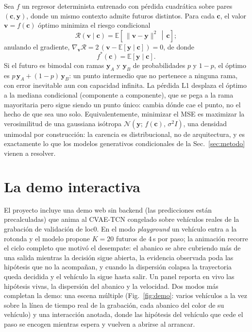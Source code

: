 \documentclass[conference,a4paper]{IEEEtran}
\begin{document}
Sea $f$ un regresor determinista entrenado con pérdida cuadrática sobre
pares $(\mathbf{c}, \mathbf{y})$, donde un mismo contexto admite futuros
distintos. Para cada $\mathbf{c}$, el valor $\mathbf{v} = f(\mathbf{c})$
óptimo minimiza el riesgo condicional
\begin{equation}
\mathcal{R}(\mathbf{v} \mid \mathbf{c}) =
\mathbb{E}\!\left[\,\|\mathbf{v}-\mathbf{y}\|^2 \,\middle|\, \mathbf{c}\right];
\end{equation}
anulando el gradiente, $\nabla_{\mathbf{v}} \mathcal{R} =
2\,(\mathbf{v} - \mathbb{E}[\mathbf{y} \mid \mathbf{c}]) = 0$, de donde
\begin{equation}
f^{*}(\mathbf{c}) = \mathbb{E}\left[\mathbf{y} \mid \mathbf{c}\right].
\end{equation}
Si el futuro es bimodal con ramas $\mathbf{y}_A$ y $\mathbf{y}_B$ de
probabilidades $p$ y $1-p$, el óptimo es
$p\,\mathbf{y}_A + (1-p)\,\mathbf{y}_B$: un punto intermedio que no
pertenece a ninguna rama, con error inevitable aun con capacidad infinita.
La pérdida L1 desplaza el óptimo a la mediana condicional (componente a
componente), que se pega a la rama mayoritaria pero sigue siendo un punto
único: cambia dónde cae el punto, no el hecho de que sea uno solo.
Equivalentemente, minimizar el MSE es maximizar la verosimilitud de una
gaussiana isótropa $\mathcal{N}(\mathbf{y};\, f(\mathbf{c}),\, \sigma^2 I)$,
una densidad unimodal por construcción: la carencia es distribucional, no
de arquitectura, y es exactamente lo que los modelos generativos
condicionales de la Sec.~\ref{sec:metodo} vienen a resolver.

\section{La demo interactiva}
\label{ap:demo}

El proyecto incluye una demo web sin backend (las predicciones están
precalculadas) que anima al CVAE-TCN congelado sobre vehículos reales de
la grabación de validación de loc0. En el modo \emph{playground} un
vehículo entra a la rotonda y el modelo propone
$K=20$ futuros de 4\,s por paso; la animación recorre el ciclo completo
que motivó el desempate: el abanico se abre cubriendo más de una salida
mientras la decisión sigue abierta, la evidencia observada poda las
hipótesis que no la acompañan, y cuando la dispersión colapsa la
trayectoria queda decidida y el vehículo la sigue hasta salir. Un panel
reporta en vivo las hipótesis vivas, la dispersión del abanico y la
velocidad. Dos modos más completan la demo: una escena múltiple
(Fig.~\ref{fig:demo}: varios vehículos a la vez sobre la línea de tiempo
real de la grabación, cada abanico del color de su vehículo) y una
interacción anotada, donde las
hipótesis del vehículo que cede el paso se encogen mientras espera y
vuelven a abrirse al arrancar.
\end{document}

